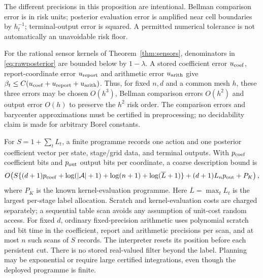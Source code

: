 The different precisions in this proposition are intentional. Bellman comparison error is in risk units; posterior evaluation error is amplified near cell boundaries by $h_t^{-1}$; terminal-output error is squared. A permitted numerical tolerance is not automatically an unavoidable risk floor.

For the rational sensor kernels of Theorem~\ref{thm:sensors}, denominators in \eqref{eq:rawposterior} are bounded below by $1-\lambda$. A stored coefficient error $u_{\rm coef}$, report-coordinate error $u_{\rm report}$ and arithmetic error $u_{\rm arith}$ give $\beta_t\le C(u_{\rm coef}+u_{\rm report}+u_{\rm arith})$. Thus, for fixed $n,d$ and a common mesh $h$, these three errors may be chosen $O(h^3)$, Bellman comparison errors $O(h^2)$ and output error $O(h)$ to preserve the $h^2$ risk order. The comparison errors and barycenter approximations must be certified in preprocessing; no decidability claim is made for arbitrary Borel constants.

For $S=1+\sum_tL_t$, a finite programme records one action and one posterior coefficient vector per state, stage/grid data, and terminal outputs. With $p_{\rm coef}$ coefficient bits and $p_{\rm out}$ output bits per coordinate, a coarse description bound is
\[
 O\!\left(S\{(d+1)p_{\rm coef}+\log(|\mathcal A|+1)+\log(n+1)+\log(\overline L+1)\}
       +(d+1)L_np_{\rm out}+P_K\right),
\]
where $P_K$ is the known kernel-evaluation programme. Here $\overline L=\max_tL_t$ is the largest per-stage label allocation. Scratch and kernel-evaluation costs are charged separately; a sequential table scan avoids any assumption of unit-cost random access. For fixed $d$, ordinary fixed-precision arithmetic uses polynomial scratch and bit time in the coefficient, report and arithmetic precisions per scan, and at most $n$ such scans of $S$ records. The interpreter resets its position before each persistent cut. There is no stored real-valued filter beyond the label. Planning may be exponential or require large certified integrations, even though the deployed programme is finite.

